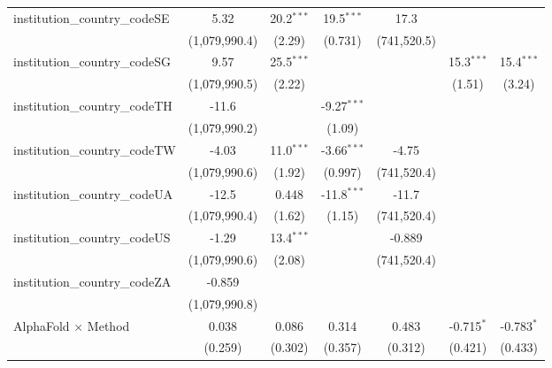\begin{tabular}{lcccccc}
   institution\_country\_codeSE          & 5.32          & 20.2$^{***}$  & 19.5$^{***}$  & 17.3          &               &   \\   
                                         & (1,079,990.4) & (2.29)        & (0.731)       & (741,520.5)   &               &   \\   
   institution\_country\_codeSG          & 9.57          & 25.5$^{***}$  &               &               & 15.3$^{***}$  & 15.4$^{***}$\\   
                                         & (1,079,990.5) & (2.22)        &               &               & (1.51)        & (3.24)\\   
   institution\_country\_codeTH          & -11.6         &               & -9.27$^{***}$ &               &               &   \\   
                                         & (1,079,990.2) &               & (1.09)        &               &               &   \\   
   institution\_country\_codeTW          & -4.03         & 11.0$^{***}$  & -3.66$^{***}$ & -4.75         &               &   \\   
                                         & (1,079,990.6) & (1.92)        & (0.997)       & (741,520.4)   &               &   \\   
   institution\_country\_codeUA          & -12.5         & 0.448         & -11.8$^{***}$ & -11.7         &               &   \\   
                                         & (1,079,990.4) & (1.62)        & (1.15)        & (741,520.4)   &               &   \\   
   institution\_country\_codeUS          & -1.29         & 13.4$^{***}$  &               & -0.889        &               &   \\   
                                         & (1,079,990.6) & (2.08)        &               & (741,520.4)   &               &   \\   
   institution\_country\_codeZA          & -0.859        &               &               &               &               &   \\   
                                         & (1,079,990.8) &               &               &               &               &   \\   
   AlphaFold $\times$ Method             & 0.038         & 0.086         & 0.314         & 0.483         & -0.715$^{*}$  & -0.783$^{*}$\\   
                                         & (0.259)       & (0.302)       & (0.357)       & (0.312)       & (0.421)       & (0.433)\\   

\end{tabular}
